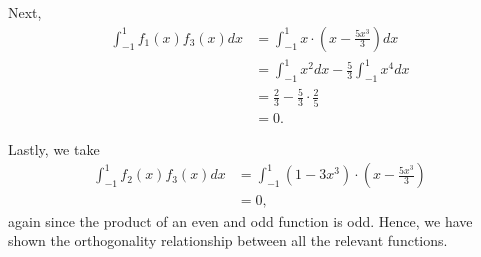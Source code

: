 \documentclass[12pt]{article} %
\begin{document}
\begin{solution}
\begin{enumerate}[(a)]
    Next,
    \begin{align*}
        \int_{-1}^1 f_1(x)f_3(x)dx &= \int_{-1}^1 x\cdot \left( x-\frac{5x^3}{3}\right)dx\\
        &= \int_{-1}^1 x^2 dx - \frac{5}{3}\int_{-1}^1 x^4 dx \\
        &= \frac{2}{3} - \frac{5}{3}\cdot \frac{2}{5}\\
        &=0.
    \end{align*}
    
    Lastly, we take
    \begin{align*}
        \int_{-1}^1 f_2(x) f_3(x)dx &= \int_{-1}^1 \left(1-3x^3\right) \cdot \left( x-\frac{5x^3}{3}\right)\\
        &=0,
    \end{align*}
    again since the product of an even and odd function is odd. Hence, we have shown the orthogonality relationship between all the relevant functions.
\end{enumerate}
\end{solution}
\end{document}
